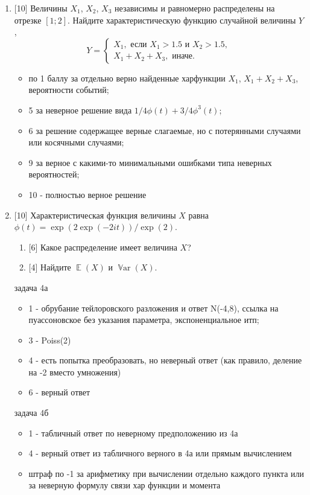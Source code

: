 \documentclass[12pt]{article}
\DeclareMathOperator{\Var}{\mathbb{V}ar}
\DeclareMathOperator{\E}{\mathbb{E}}
\begin{document}
\begin{enumerate}
\item {[10]} Величины $X_1$, $X_2$, $X_3$ независимы и равномерно распределены на отрезке $[1;2]$.
Найдите характеристическую функцию случайной величины $Y$,
\[
Y = \begin{cases}
    X_1, \text{ если } X_1 > 1.5 \text{ и } X_2 > 1.5, \\
    X_1 + X_2 + X_3, \text{ иначе.}
\end{cases}
\]



\begin{itemize}
    \item по 1 баллу за отдельно верно найденные харфункции $X_1$, $X_1+X_2+X_3$, вероятности событий;
    \item 5 за неверное решение вида $1/4 \phi(t)+3/4 \phi^3(t)$;
    \item 6 за решение содержащее верные слагаемые, но с потерянными случаями или косячными случаями;
    \item 9 за верное с какими-то минимальными ошибками типа неверных вероятностей;
    \item 10 - полностью верное решение
\end{itemize}

\item {[10]} Характеристическая функция величины $X$ равна $\phi(t) = \exp(2\exp(-2it))/\exp(2)$.
\begin{enumerate}
    \item {[6]} Какое распределение имеет величина $X$?
    \item {[4]} Найдите $\E(X)$ и $\Var(X)$.
\end{enumerate}


задача 4а
\begin{itemize}
    \item 1  - обрубание тейлоровского разложения и ответ N(-4,8), ссылка на пуассоновское без указания параметра, экспоненциальное итп;
    \item 3 - Poiss(2)
    \item 4 - есть попытка преобразовать, но неверный ответ (как правило, деление на -2 вместо умножения)
    \item 6 - верный ответ
\end{itemize}

задача 4б 
\begin{itemize}
    \item 1 - табличный ответ по неверному предположению из 4а
    \item 4 - верный ответ из табличного верного в 4а или прямым вычислением
    \item штраф по -1 за арифметику при вычислении отдельно каждого пункта или за неверную формулу связи хар функции и момента
\end{itemize}




\end{enumerate}
\end{document}
